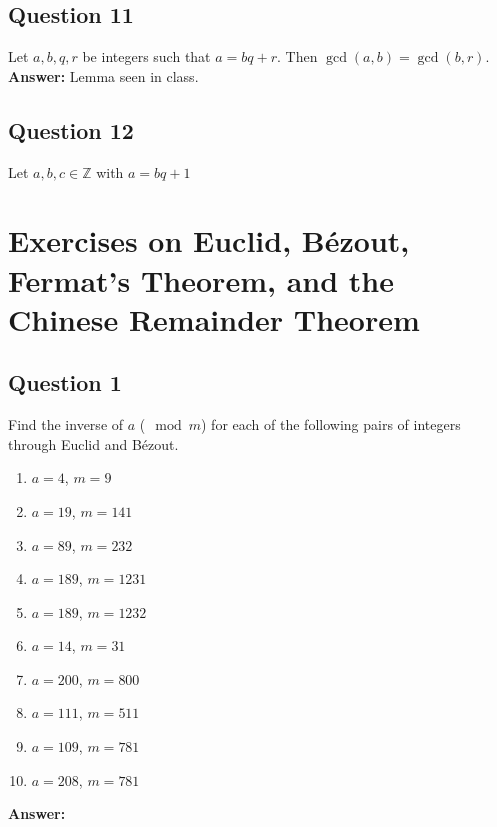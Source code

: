 \documentclass[openany]{report}
\begin{document}
\section{Question 11}
Let $a,b,q,r$ be integers such that $a = bq+r$. Then $\gcd(a,b) = \gcd(b,r)$.
\textbf{Answer:} Lemma seen in class. 
\section{Question 12}
Let $a,b,c \in \mathbb{Z}$ with $a = bq+1$
\chapter{Exercises on Euclid, B\'ezout, Fermat's Theorem, and the Chinese Remainder Theorem}
\section{Question 1}
Find the inverse of $a$ ($\mod m$) for each of the following pairs of integers through Euclid and B\'ezout.
\begin{enumerate}[label=(\alph*)]
    \item $a=4$, $m=9$
    \item $a=19$, $m=141$
    \item $a=89$, $m=232$
    \item $a=189$, $m=1231$
    \item $a=189$, $m=1232$
    \item $a=14$, $m=31$
    \item $a=200$, $m=800$
    \item $a=111$, $m=511$
    \item $a=109$, $m=781$
    \item $a=208$, $m=781$
\end{enumerate}
\textbf{Answer:}
\end{document}

